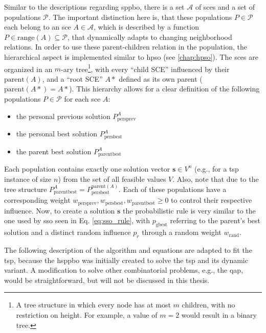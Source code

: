 Similar to the descriptions regarding \gls{sppbo}, there is a set $\mathcal{A}$ of \glspl{sce} and a set of populations $\mathcal{P}$. The important distinction here is, that these populations $P \in \mathcal{P}$ each belong to an \gls{sce} $A \in \mathcal{A}$, which is described by a function $P\in \text{range}(A) \subseteq \mathcal{P}$, that dynamically adapts to changing neighborhood relations. In order to use these parent-children relation in the population, the hierarchical aspect is implemented similar to \gls{hpso} (see \ref{chap:hpso}). The \glspl{sce} are organized in an $m$-ary tree\footnote{A tree structure in which every node has at most $m$ children, with no restriction on height. For example, a value of $m=2$ would result in a binary tree.}, with every \enquote{child SCE} influenced by their $\text{parent}(A)$, and a \enquote{root SCE} $A*$ defined as its own parent ($\text{parent}(A*) = A*$). This hierarchy allows for a clear definition of the following populations $P\in \mathcal{P}$ for each \gls{sce} $A$:
\begin{itemize}
	\item the personal previous solution $P^{A}_{\text{persprev}}$
	\item the personal best solution $P^{A}_{\text{persbest}}$
	\item the parent best solution $P^{A}_{\text{parentbest}}$
\end{itemize}
Each population contains exactly one solution vector $\mathbf{s} \in V^n$ (e.g., for a \gls{tsp} instance of size $n$) from the set of all feasible values $V$. Also, note that due to the tree structure $P^{A}_{\text{parentbest}} = P^{\text{parent}(A)}_{\text{persbest}}$. Each of these populations have a corresponding weight $w_{\text{persprev}}, w_{\text{persbest}}, w_{\text{parentbest}} \geq 0$ to control their respective influence. 
Now, to create a solution $\mathbf{s}$ the probabilistic rule is very similar to the one used by \gls{sso} seen in Eq. \eqref{eq:sso_rule}, with $p_{\text{gbest}}$ referring to the parent's best solution and a distinct random influence $p_r$ through a random weight $w_\text{rand}$.

The following description of the algorithm and equations are adapted to fit the \gls{tsp}, because the \gls{hsppbo} was initially created to solve the \gls{tsp} and its dynamic variant. A modification to solve other combinatorial problems, e.g., the \gls{qap}, would be straightforward, but will not be discussed in this thesis.

